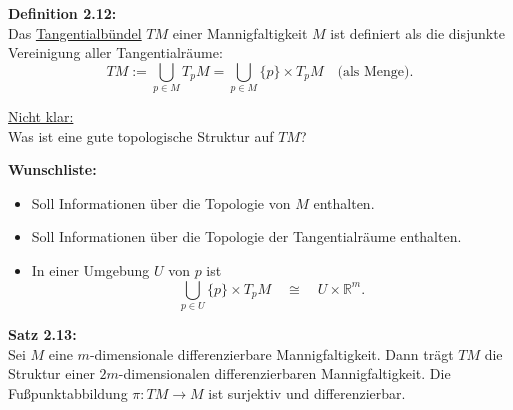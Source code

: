 \documentclass[fleqn, 12pt, letterpaper]{article}
\begin{document}
\textbf{Definition 2.12:} \\
Das \underline{Tangentialbündel} \(TM\) einer Mannigfaltigkeit \(M\) ist definiert als die disjunkte Vereinigung aller Tangentialräume:
\[
TM := \bigcup_{p\in M}T_pM = \bigcup_{p\in M}\{p\}\times T_pM \quad \text{(als Menge)}.
\]

\underline{Nicht klar:} \\
Was ist eine gute topologische Struktur auf \(TM\)?

\vspace{0.5em}

\textbf{Wunschliste:}
\begin{itemize}
    \item Soll Informationen über die Topologie von \(M\) enthalten.
    \item Soll Informationen über die Topologie der Tangentialräume enthalten.
    \item  In einer Umgebung \(U\) von \(p\) ist \[
\bigcup_{p\in U}\{p\}\times T_p M \quad \cong \quad U \times \mathbb{R}^m.
\]
\end{itemize}
   
\vspace{0.5em}

\textbf{Satz 2.13:} \\
Sei \(M\) eine \(m\)-dimensionale differenzierbare Mannigfaltigkeit. Dann trägt \(TM\) die Struktur einer \(2m\)-dimensionalen differenzierbaren Mannigfaltigkeit.  
Die Fußpunktabbildung \(\pi: TM \to M\) ist surjektiv und differenzierbar.
\end{document}
